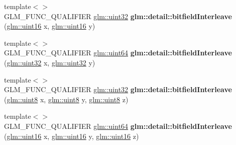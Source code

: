 \begin{DoxyCompactItemize}
\item 
\hypertarget{namespaceglm_1_1detail_ac5f2b38221d4447775e88f1b003f8113}{{\footnotesize template$<$$>$ }\\G\-L\-M\-\_\-\-F\-U\-N\-C\-\_\-\-Q\-U\-A\-L\-I\-F\-I\-E\-R \hyperlink{group__gtc__type__precision_ga202b6a53c105fcb7e531f9b443518451}{glm\-::uint32} {\bfseries glm\-::detail\-::bitfield\-Interleave} (\hyperlink{group__gtc__type__precision_gad8c2939e1fdd8e5828b31d95c52255d5}{glm\-::uint16} x, \hyperlink{group__gtc__type__precision_gad8c2939e1fdd8e5828b31d95c52255d5}{glm\-::uint16} y)}\label{namespaceglm_1_1detail_ac5f2b38221d4447775e88f1b003f8113}

\item 
\hypertarget{namespaceglm_1_1detail_a7f40bc91b3d293fae0f7df8de85cdcc6}{{\footnotesize template$<$$>$ }\\G\-L\-M\-\_\-\-F\-U\-N\-C\-\_\-\-Q\-U\-A\-L\-I\-F\-I\-E\-R \hyperlink{group__gtc__type__precision_gae3632bf9b37da66233d78930dd06378a}{glm\-::uint64} {\bfseries glm\-::detail\-::bitfield\-Interleave} (\hyperlink{group__gtc__type__precision_ga202b6a53c105fcb7e531f9b443518451}{glm\-::uint32} x, \hyperlink{group__gtc__type__precision_ga202b6a53c105fcb7e531f9b443518451}{glm\-::uint32} y)}\label{namespaceglm_1_1detail_a7f40bc91b3d293fae0f7df8de85cdcc6}

\item 
\hypertarget{namespaceglm_1_1detail_a27e9c62ce3ad180236573daec6a6461f}{{\footnotesize template$<$$>$ }\\G\-L\-M\-\_\-\-F\-U\-N\-C\-\_\-\-Q\-U\-A\-L\-I\-F\-I\-E\-R \hyperlink{group__gtc__type__precision_ga202b6a53c105fcb7e531f9b443518451}{glm\-::uint32} {\bfseries glm\-::detail\-::bitfield\-Interleave} (\hyperlink{group__gtc__type__precision_ga1a7dcd8aac97cc8020817c94049deff2}{glm\-::uint8} x, \hyperlink{group__gtc__type__precision_ga1a7dcd8aac97cc8020817c94049deff2}{glm\-::uint8} y, \hyperlink{group__gtc__type__precision_ga1a7dcd8aac97cc8020817c94049deff2}{glm\-::uint8} z)}\label{namespaceglm_1_1detail_a27e9c62ce3ad180236573daec6a6461f}

\item 
\hypertarget{namespaceglm_1_1detail_aceed48a30e6dc4f2c64945a60369d73d}{{\footnotesize template$<$$>$ }\\G\-L\-M\-\_\-\-F\-U\-N\-C\-\_\-\-Q\-U\-A\-L\-I\-F\-I\-E\-R \hyperlink{group__gtc__type__precision_gae3632bf9b37da66233d78930dd06378a}{glm\-::uint64} {\bfseries glm\-::detail\-::bitfield\-Interleave} (\hyperlink{group__gtc__type__precision_gad8c2939e1fdd8e5828b31d95c52255d5}{glm\-::uint16} x, \hyperlink{group__gtc__type__precision_gad8c2939e1fdd8e5828b31d95c52255d5}{glm\-::uint16} y, \hyperlink{group__gtc__type__precision_gad8c2939e1fdd8e5828b31d95c52255d5}{glm\-::uint16} z)}\label{namespaceglm_1_1detail_aceed48a30e6dc4f2c64945a60369d73d}


\end{DoxyCompactItemize}
